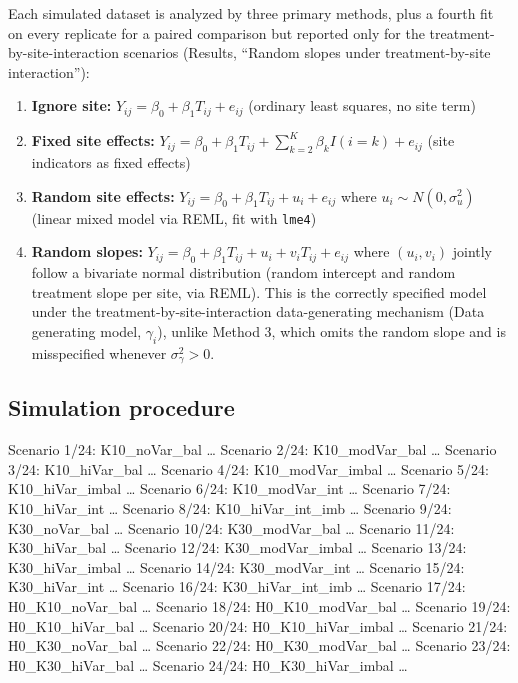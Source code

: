 \documentclass[
  11pt,
]{article}
\providecommand{\tightlist}{%
  \setlength{\itemsep}{0pt}\setlength{\parskip}{0pt}}
\begin{document}
Each simulated dataset is analyzed by three primary methods,
plus a fourth fit on every replicate for a paired comparison
but reported only for the treatment-by-site-interaction
scenarios (Results, ``Random slopes under treatment-by-site
interaction''):

\begin{enumerate}
\def\labelenumi{\arabic{enumi}.}
\tightlist
\item
  \textbf{Ignore site:} \(Y_{ij} = \beta_0 + \beta_1 T_{ij} + e_{ij}\)
  (ordinary least squares, no site term)
\item
  \textbf{Fixed site effects:}
  \(Y_{ij} = \beta_0 + \beta_1 T_{ij} + \sum_{k=2}^{K} \beta_k I(i=k) + e_{ij}\)
  (site indicators as fixed effects)
\item
  \textbf{Random site effects:}
  \(Y_{ij} = \beta_0 + \beta_1 T_{ij} + u_i + e_{ij}\)
  where \(u_i \sim N(0, \sigma^2_u)\) (linear mixed model
  via REML, fit with \texttt{lme4})
\item
  \textbf{Random slopes:}
  \(Y_{ij} = \beta_0 + \beta_1 T_{ij} + u_i + v_i T_{ij} + e_{ij}\)
  where \((u_i, v_i)\) jointly follow a bivariate normal
  distribution (random intercept and random treatment slope
  per site, via REML). This is the correctly specified model
  under the treatment-by-site-interaction data-generating
  mechanism (Data generating model, \(\gamma_i\)), unlike
  Method 3, which omits the random slope and is misspecified
  whenever \(\sigma^2_{\gamma} > 0\).
\end{enumerate}

\subsection{Simulation procedure}\label{simulation-procedure}

Scenario 1/24: K10\_noVar\_bal \ldots{}
Scenario 2/24: K10\_modVar\_bal \ldots{}
Scenario 3/24: K10\_hiVar\_bal \ldots{}
Scenario 4/24: K10\_modVar\_imbal \ldots{}
Scenario 5/24: K10\_hiVar\_imbal \ldots{}
Scenario 6/24: K10\_modVar\_int \ldots{}
Scenario 7/24: K10\_hiVar\_int \ldots{}
Scenario 8/24: K10\_hiVar\_int\_imb \ldots{}
Scenario 9/24: K30\_noVar\_bal \ldots{}
Scenario 10/24: K30\_modVar\_bal \ldots{}
Scenario 11/24: K30\_hiVar\_bal \ldots{}
Scenario 12/24: K30\_modVar\_imbal \ldots{}
Scenario 13/24: K30\_hiVar\_imbal \ldots{}
Scenario 14/24: K30\_modVar\_int \ldots{}
Scenario 15/24: K30\_hiVar\_int \ldots{}
Scenario 16/24: K30\_hiVar\_int\_imb \ldots{}
Scenario 17/24: H0\_K10\_noVar\_bal \ldots{}
Scenario 18/24: H0\_K10\_modVar\_bal \ldots{}
Scenario 19/24: H0\_K10\_hiVar\_bal \ldots{}
Scenario 20/24: H0\_K10\_hiVar\_imbal \ldots{}
Scenario 21/24: H0\_K30\_noVar\_bal \ldots{}
Scenario 22/24: H0\_K30\_modVar\_bal \ldots{}
Scenario 23/24: H0\_K30\_hiVar\_bal \ldots{}
Scenario 24/24: H0\_K30\_hiVar\_imbal \ldots{}
\end{document}
